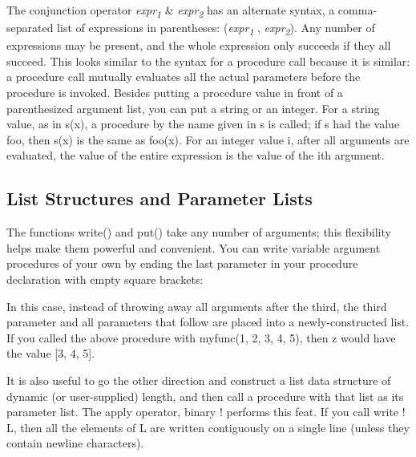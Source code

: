 The conjunction operator
\textsf{\textit{expr}}\textsf{\textit{\textsubscript{1}}}\textsf{ \&
}\textsf{\textit{expr}}\textsf{\textit{\textsubscript{2}}} has an
alternate syntax, a comma-separated list of expressions in parentheses:
\textsf{(}\textsf{\textit{expr}}\textsf{\textit{\textsubscript{1}}}\textsf{
, }\textsf{\textit{expr}}\textsf{\textit{\textsubscript{2}}}\textsf{)}.
Any number of expressions may be present, and the whole expression only
succeeds if they all succeed. This looks similar to the syntax for a
procedure call because it is similar: a procedure call mutually
evaluates all the actual parameters before the procedure is invoked.
Besides putting a procedure value in front of a parenthesized argument
list, you can put a string or an integer. For a string value, as in
\textsf{s(x)}, a procedure by the name given in \textsf{s} is called;
if \textsf{s} had the value \textsf{{\textquotedbl}foo{\textquotedbl}},
then \textsf{s(x)} is the same as \textsf{foo(x)}. For an integer value
\textsf{i}, after all arguments are evaluated, the value of the entire
expression is the value of the \textsf{i}{\textquotesingle}th argument.

\subsection{List Structures and Parameter Lists}
The functions \textsf{write()} and \textsf{put()} take any number of
arguments; this flexibility helps make them powerful and convenient.
You can write variable argument
procedures of your own by ending the last parameter in your procedure
declaration with empty square brackets:


In this case, instead of throwing away all arguments after the third,
the third parameter and all parameters that follow are placed into a
newly-constructed list. If you called the above procedure with
\textsf{myfunc(1, 2, 3, 4, 5)}, then \textsf{z} would have the value
\textsf{[3, 4, 5]}.

It is also useful to go the other direction and construct a list data
structure of dynamic (or user-supplied) length, and then call a
procedure with that list as its parameter list. The
apply operator, binary
\textsf{!} performs this feat. If you call \textsf{write ! L}, then all
the elements of \textsf{L} are written contiguously on a single line
(unless they contain newline characters).

